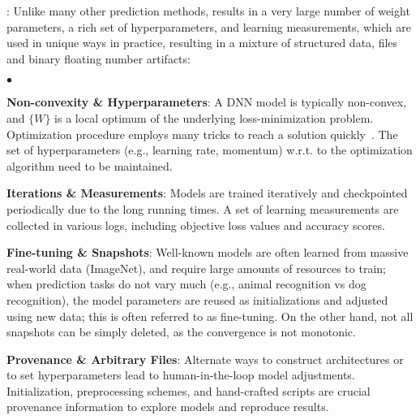 \documentclass[conference]{IEEEtran}
\begin{document}
: 
Unlike many other prediction methods, \dnn\modeling results in a very large number of weight parameters, a rich set of hyperparameters, and learning measurements, which are used in unique ways in practice, resulting in a mixture of structured data, files and binary floating number artifacts: 
\begin{list}{$\bullet$}{\leftmargin 0.10in \topsep -2pt} %
\item \textbf{Non-convexity \& Hyperparameters}: A DNN model is typically non-convex, and $\{W\}$ is a local optimum of the underlying loss-minimization problem. Optimization procedure employs many tricks to reach a solution quickly~\cite{sgdtrick2012dnntrickbook}. The set of hyperparameters (e.g., learning rate, momentum) w.r.t. to the optimization algorithm need to be maintained. 
\item \textbf{Iterations \& Measurements}: Models are trained iteratively and checkpointed periodically due to the long running times.  A set of learning measurements are collected in various logs, including objective loss values and accuracy scores. %
\item \textbf{Fine-tuning \& Snapshots}: Well-known models are often learned from massive real-world data (ImageNet), and require large amounts of resources to train; when prediction tasks do not vary much (e.g., animal recognition vs dog recognition), the model parameters are reused as initializations and adjusted using new data; this is often referred to as fine-tuning. On the other hand, not all snapshots can be simply deleted, as the convergence is not monotonic.
\item \textbf{Provenance \& Arbitrary Files}: Alternate ways to construct architectures or to set hyperparameters lead to human-in-the-loop model adjustments. Initialization, preprocessing schemes, and hand-crafted scripts are crucial provenance information to explore models and reproduce results.
\end{list}


\end{document}
